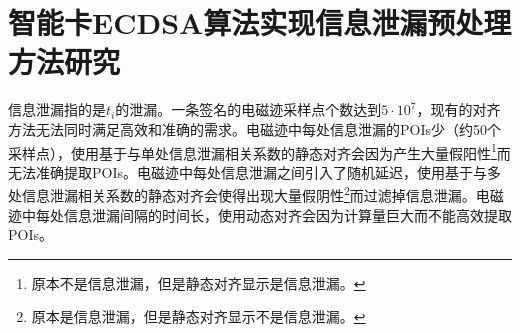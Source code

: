 {%
%	
%	
%	
%	
%	
%		
%	
	
	
	\section{智能卡ECDSA算法实现信息泄漏预处理方法研究}
	
	信息泄漏指的是$t_i$的泄漏。一条签名的电磁迹采样点个数达到$5\cdot10^{7}$，现有的对齐方法无法同时满足高效和准确的需求。电磁迹中每处信息泄漏的POIs少（约50个采样点），使用基于与单处信息泄漏相关系数的静态对齐会因为产生大量假阳性\footnote{原本不是信息泄漏，但是静态对齐显示是信息泄漏。}而无法准确提取POIs。电磁迹中每处信息泄漏之间引入了随机延迟，使用基于与多处信息泄漏相关系数的静态对齐会使得出现大量假阴性\footnote{原本是信息泄漏，但是静态对齐显示不是信息泄漏。}而过滤掉信息泄漏。电磁迹中每处信息泄漏间隔的时间长，使用动态对齐会因为计算量巨大而不能高效提取POIs。
	
}
